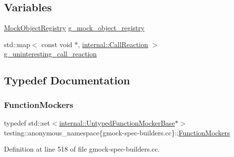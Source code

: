 \subsection*{Variables}
\begin{DoxyCompactItemize}
\item 
\hyperlink{classtesting_1_1anonymous__namespace_02gmock-spec-builders_8cc_03_1_1MockObjectRegistry}{Mock\+Object\+Registry} \hyperlink{namespacetesting_1_1anonymous__namespace_02gmock-spec-builders_8cc_03_a41848551bdaeda82b291e868de355fc7}{g\+\_\+mock\+\_\+object\+\_\+registry}
\item 
std\+::map$<$ const void $\ast$, \hyperlink{namespacetesting_1_1internal_adfcd859062983a889f4bd18e6977357e}{internal\+::\+Call\+Reaction} $>$ \hyperlink{namespacetesting_1_1anonymous__namespace_02gmock-spec-builders_8cc_03_ab456ef4b8025f61463aa08ba4098dceb}{g\+\_\+uninteresting\+\_\+call\+\_\+reaction}
\end{DoxyCompactItemize}


\subsection{Typedef Documentation}
\mbox{\label{namespacetesting_1_1anonymous__namespace_02gmock-spec-builders_8cc_03_abf8c9e1e1f8466bdd16e9f399af53be3}} 
\subsubsection{\texorpdfstring{Function\+Mockers}{FunctionMockers}}
{\footnotesize\ttfamily typedef std\+::set$<$\hyperlink{classtesting_1_1internal_1_1UntypedFunctionMockerBase}{internal\+::\+Untyped\+Function\+Mocker\+Base}$\ast$$>$ testing\+::anonymous\+\_\+namespace\{gmock-\/spec-\/builders.\+cc\}\+::\hyperlink{namespacetesting_1_1anonymous__namespace_02gmock-spec-builders_8cc_03_abf8c9e1e1f8466bdd16e9f399af53be3}{Function\+Mockers}}



Definition at line 518 of file gmock-\/spec-\/builders.\+cc.



